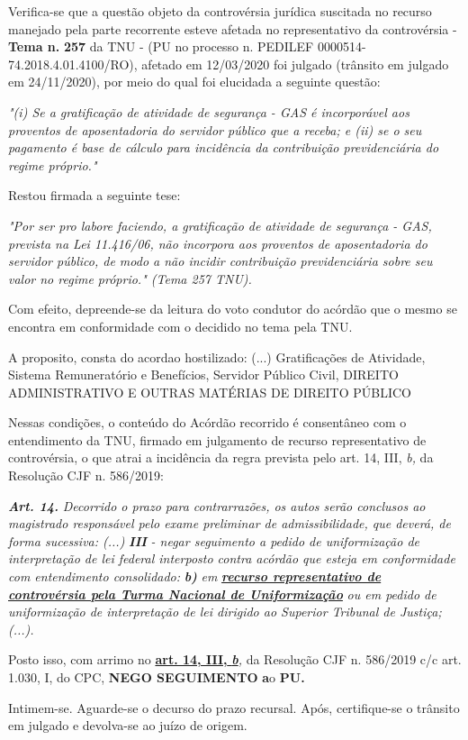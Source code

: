 \documentclass[12pt]{article}
\begin{document}
\justifying
\noindent Verifica-se que a questão objeto da controvérsia jurídica suscitada no recurso manejado pela parte recorrente esteve afetada no representativo da controvérsia - \textbf{Tema n. }\textbf{257} da TNU - (PU no processo n. PEDILEF 0000514-74.2018.4.01.4100/RO),  afetado em 12/03/2020 foi julgado (trânsito em julgado em 24/11/2020), por meio do qual foi elucidada a seguinte questão:

\noindent \textit{"(i) Se a gratificação de atividade de segurança - GAS é incorporável aos proventos de aposentadoria do servidor público que a receba;  e (ii) se o seu pagamento é base de cálculo para incidência da contribuição previdenciária do regime próprio."}

\noindent Restou firmada a seguinte tese:

\noindent \textit{"Por ser pro labore faciendo, a gratificação de atividade de segurança - GAS, prevista na Lei 11.416/06, não incorpora aos proventos de aposentadoria do servidor público, de modo a não incidir contribuição previdenciária sobre seu valor no regime próprio." (Tema 257 TNU).}

\noindent Com efeito, depreende-se da leitura do voto condutor do acórdão que o mesmo se encontra em conformidade com o decidido no  tema pela TNU.

\noindent A proposito, consta do acordao hostilizado: (...) Gratificações de Atividade, Sistema Remuneratório e Benefícios, Servidor Público Civil, DIREITO ADMINISTRATIVO E OUTRAS MATÉRIAS DE DIREITO PÚBLICO

\noindent Nessas condições, o conteúdo do Acórdão recorrido é consentâneo com o entendimento da TNU, firmado em julgamento de recurso representativo de controvérsia, o que atrai a incidência da regra prevista pelo art. 14, III, \textit{b,} da Resolução CJF n. 586/2019:

\noindent \textit{\textbf{Art. 14.}}\textit{ Decorrido o prazo para contrarrazões, os autos serão conclusos ao magistrado responsável pelo exame preliminar de admissibilidade, que deverá, de forma sucessiva: (...) }\textit{\textbf{III }}\textit{- negar seguimento a pedido de uniformização de interpretação de lei federal interposto contra acórdão que esteja em conformidade com entendimento consolidado: }\textit{\textbf{b)}}\textit{ em }\uline{\textit{\textbf{recurso representativo de controvérsia pela Turma Nacional de Uniformização}}}\textit{ ou em pedido de uniformização de interpretação de lei dirigido ao Superior Tribunal de Justiça;(...).}

\noindent Posto isso, com arrimo no \uline{\textbf{art. 14, III, }}\uline{\textit{\textbf{b}}}\textit{,} da Resolução CJF n. 586/2019 c/c art. 1.030, I, do CPC, \textbf{NEGO SEGUIMENTO }\textbf{a}o\textbf{ PU}\textbf{.}

\noindent Intimem-se. Aguarde-se o decurso do prazo recursal. Após, certifique-se o trânsito em julgado e devolva-se ao juízo de origem.
\end{document}
